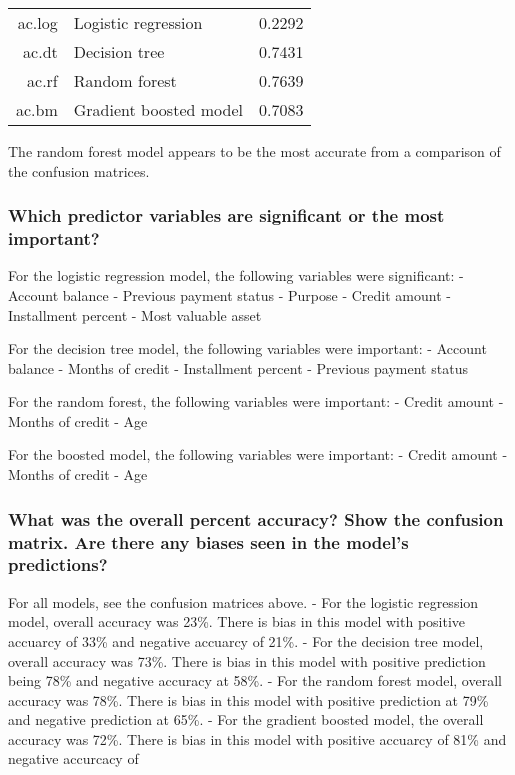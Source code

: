 \documentclass[11pt]{article}
\begin{document}
    \begin{tabular}{r|ll}
	ac.log & Logistic regression    & 0.2292                \\
	ac.dt & Decision tree          & 0.7431                \\
	ac.rf & Random forest          & 0.7639                \\
	ac.bm & Gradient boosted model & 0.7083                \\
\end{tabular}


    
    The random forest model appears to be the most accurate from a
comparison of the confusion matrices.

    \subsubsection{Which predictor variables are significant or the most
important?}\label{which-predictor-variables-are-significant-or-the-most-important}

    For the logistic regression model, the following variables were
significant: - Account balance - Previous payment status - Purpose -
Credit amount - Installment percent - Most valuable asset

For the decision tree model, the following variables were important: -
Account balance - Months of credit - Installment percent - Previous
payment status

For the random forest, the following variables were important: - Credit
amount - Months of credit - Age

For the boosted model, the following variables were important: - Credit
amount - Months of credit - Age

    \subsubsection{What was the overall percent accuracy? Show the confusion
matrix. Are there any biases seen in the model's
predictions?}\label{what-was-the-overall-percent-accuracy-show-the-confusion-matrix.-are-there-any-biases-seen-in-the-models-predictions}

For all models, see the confusion matrices above. - For the logistic
regression model, overall accuracy was 23\%. There is bias in this model
with positive accuarcy of 33\% and negative accuarcy of 21\%. - For the
decision tree model, overall accuracy was 73\%. There is bias in this
model with positive prediction being 78\% and negative accuracy at 58\%.
- For the random forest model, overall accuracy was 78\%. There is bias
in this model with positive prediction at 79\% and negative prediction
at 65\%. - For the gradient boosted model, the overall accuracy was
72\%. There is bias in this model with positive accuarcy of 81\% and
negative accurcacy of
\end{document}
